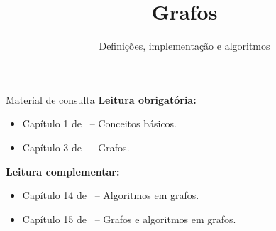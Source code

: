 \newcommand{\templatesdir}{../../../templates}
\newcommand{\template}{template-slides-est}


\title[Grafos]{Grafos}
\subtitle{Definições, implementação e algoritmos}

\immediate{}
\immediate{}
\immediate{}
\immediate{}



\maketitle

\begin{frame}{Material de consulta}
	\textbf{Leitura obrigatória:}
	\begin{itemize}
		\item Capítulo 1 de~\cite{Goldbarg2AndGoldbarg2012} -- Conceitos básicos.
		\item Capítulo 3 de~\cite{KleinbergAndTardos2006} -- Grafos.
	\end{itemize}
	
	\bigskip
	
	\textbf{Leitura complementar:}
	\begin{itemize}
		\item Capítulo 14 de~\cite{GoodrichEtAl2014} -- Algoritmos em grafos.
		\item Capítulo 15 de~\cite{Preiss2001} -- Grafos e algoritmos em grafos.
	\end{itemize}
\end{frame}


